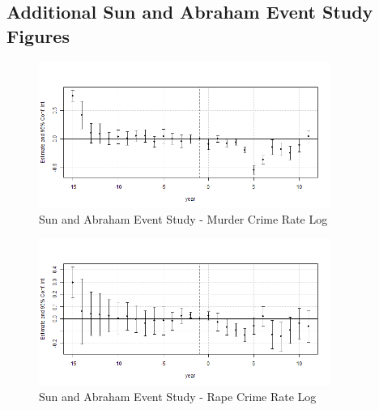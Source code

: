 \documentclass{article}
\begin{document}








\newpage

\subsection{Additional Sun and Abraham Event Study Figures}

\begin{figure}[H]
	\begin{center}
		\includegraphics[width=0.85\textwidth]{murder}
	\end{center}
	\caption{Sun and Abraham Event Study - Murder Crime Rate Log}
	\label{fig:murder_graph}
\end{figure}

\begin{figure}[H]
	\begin{center}
		\includegraphics[width=0.85\textwidth]{rape}
	\end{center}
	\caption{Sun and Abraham Event Study - Rape Crime Rate Log}
	\label{fig:rape_graph}
\end{figure}
\end{document}
